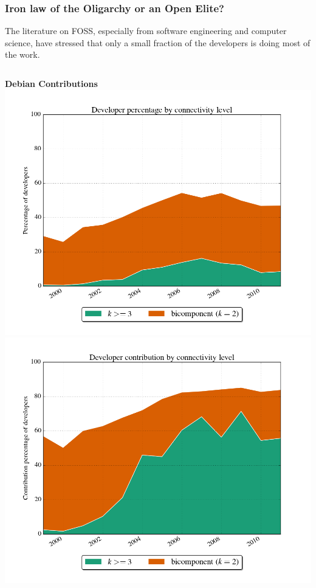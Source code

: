 \documentclass[ignorenonframetext,red,8pt,notes=show]{beamer}
\begin{document}
\begin{frame}
\frametitle{Iron law of the Oligarchy or an Open Elite?}

The literature on FOSS, especially from software engineering and computer science, have stressed that only a small fraction of the developers is doing most of the work.

\begin{columns}[c]
\begin{column}{0.5\textwidth}
\begin{center}
\textbf{Debian Contributions}
\includegraphics[scale=0.16]{../../figures/evolution_developers_debian_years}
\newline
\includegraphics[scale=0.16]{../../figures/evolution_connectivity_debian_years}
\end{center}
\end{column}


\end{columns}
\end{frame}
\end{document}
